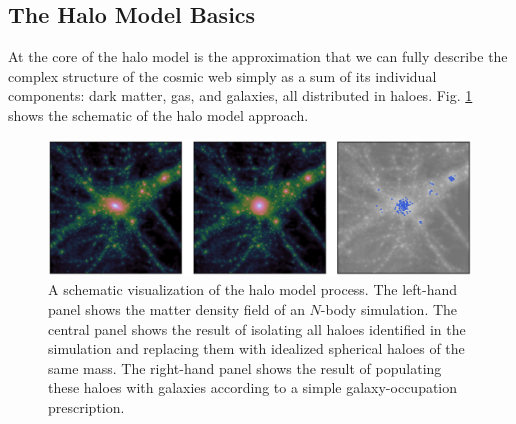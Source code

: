 \subsection{The Halo Model Basics}

At the core of the halo model is the approximation that we can fully describe the complex structure of the cosmic web simply as a sum of its individual components: dark matter, gas, and galaxies, all distributed in haloes. Fig. \ref{fig:halo} shows the schematic of the halo model approach.

\begin{figure}[htpb]
    \centering
    \includegraphics[scale=0.2]{img/halo.png}
    \caption{A schematic visualization of the halo model process. The left-hand panel shows the matter density field of an $N$-body simulation. The central panel shows the result of isolating all haloes identified in the simulation and replacing them with idealized spherical haloes of the same mass. The right-hand panel shows the result of populating these haloes with galaxies according to a simple galaxy-occupation prescription.}
    \label{fig:halo}
\end{figure}

